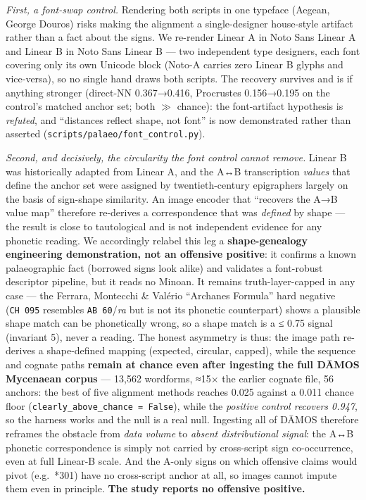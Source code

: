 \documentclass[
  10pt,
]{article}
\begin{document}
\emph{First, a font-swap control.} Rendering both scripts in one
typeface (Aegean, George Douros) risks making the alignment a
single-designer house-style artifact rather than a fact about the signs.
We re-render Linear A in Noto Sans Linear A and Linear B in Noto Sans
Linear B --- two independent type designers, each font covering only its
own Unicode block (Noto-A carries zero Linear B glyphs and vice-versa),
so no single hand draws both scripts. The recovery survives and is if
anything stronger (direct-NN 0.367→0.416, Procrustes 0.156→0.195 on the
control's matched anchor set; both \(\gg\) chance): the font-artifact
hypothesis is \emph{refuted}, and ``distances reflect shape, not font''
is now demonstrated rather than asserted
(\texttt{scripts/palaeo/font\_control.py}).

\emph{Second, and decisively, the circularity the font control cannot
remove.} Linear B was historically adapted from Linear A, and the A↔B
transcription \emph{values} that define the anchor set were assigned by
twentieth-century epigraphers largely on the basis of sign-shape
similarity. An image encoder that ``recovers the A→B value map''
therefore re-derives a correspondence that was \emph{defined} by shape
--- the result is close to tautological and is not independent evidence
for any phonetic reading. We accordingly relabel this leg a
\textbf{shape-genealogy engineering demonstration, not an offensive
positive}: it confirms a known palaeographic fact (borrowed signs look
alike) and validates a font-robust descriptor pipeline, but it reads no
Minoan. It remains truth-layer-capped in any case --- the Ferrara,
Montecchi \& Valério ``Archanes Formula'' hard negative
(\texttt{CH\ 095} resembles \texttt{AB\ 60}/\emph{ra} but is not its
phonetic counterpart) shows a plausible shape match can be phonetically
wrong, so a shape match is a ≤ 0.75 signal (invariant 5), never a
reading. The honest asymmetry is thus: the image path re-derives a
shape-defined mapping (expected, circular, capped), while the sequence
and cognate paths \textbf{remain at chance even after ingesting the full
DĀMOS Mycenaean corpus} --- 13,562 wordforms, ≈15× the earlier cognate
file, 56 anchors: the best of five alignment methods reaches 0.025
against a 0.011 chance floor
(\texttt{clearly\_above\_chance\ =\ False}), while the \emph{positive
control recovers 0.947}, so the harness works and the null is a real
null. Ingesting all of DĀMOS therefore reframes the obstacle from
\emph{data volume} to \emph{absent distributional signal}: the A↔B
phonetic correspondence is simply not carried by cross-script sign
co-occurrence, even at full Linear-B scale. And the A-only signs on
which offensive claims would pivot (e.g.~*301) have no cross-script
anchor at all, so images cannot impute them even in principle.
\textbf{The study reports no offensive positive.}
\end{document}
